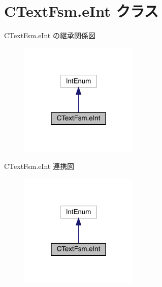 \hypertarget{classCTextFsm_1_1eInt}{}\section{C\+Text\+Fsm.\+e\+Int クラス}
\label{classCTextFsm_1_1eInt}


C\+Text\+Fsm.\+e\+Int の継承関係図
\nopagebreak
\begin{figure}[H]
\begin{center}
\leavevmode
\includegraphics[width=160pt]{classCTextFsm_1_1eInt__inherit__graph}
\end{center}
\end{figure}


C\+Text\+Fsm.\+e\+Int 連携図
\nopagebreak
\begin{figure}[H]
\begin{center}
\leavevmode
\includegraphics[width=160pt]{classCTextFsm_1_1eInt__coll__graph}
\end{center}
\end{figure}
